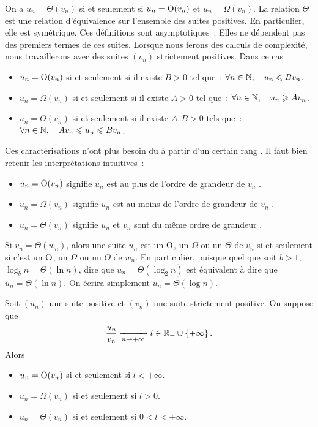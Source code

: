 \documentclass{magnolia}
\begin{document}
\begin{remarques}
\remarque On a $u_n=\Theta(v_n)$ si et seulement si  $u_n={\rm O}(v_n)$ et
  $u_n=\Omega(v_n)$.
\remarque La relation $\Theta$ est une relation d'équivalence sur l'ensemble des suites
  positives. En particulier, elle est symétrique.
\remarque Ces définitions sont asymptotiques~: Elles ne dépendent pas des premiers
  termes de ces suites.
\remarque Lorsque nous ferons des calculs de complexité, nous travaillerons avec des
  suites $(v_n)$ strictement positives. Dans ce cas
  \begin{itemize}
\item $u_n={\rm O}(v_n)$ si et seulement si il existe $B>0$ tel que~:
  $\forall n\in\mathbb{N},\quad u_n\leqslant B v_n$.
\item $u_n=\Omega(v_n)$ si et seulement si il existe $A>0$ tel que~:
  $\forall n\in\mathbb{N},\quad u_n \geqslant A v_n$.
\item $u_n=\Theta(v_n)$ si et seulement si il existe $A,B>0$ tels que~:
  $\forall n\in\mathbb{N},\quad A v_n \leqslant u_n\leqslant B v_n$.
  \end{itemize}
  Ces caractérisations n'ont plus besoin du \og à partir d'un certain rang \fg.
\remarque Il faut bien retenir les interprétations intuitives~:
  \begin{itemize}
    \item \og $u_n = {\rm O}(v_n)$ \fg signifie \og $u_n$ est au plus de l'ordre de grandeur
de $v_n$ \fg.
    \item \og $u_n = \Omega(v_n)$ \fg signifie \og $u_n$ est au moins de l'ordre de grandeur
de $v_n$ \fg.
    \item \og $u_n = \Theta(v_n)$ \fg signifie \og $u_n$ et $v_n$ sont du même ordre de
grandeur \fg.
  \end{itemize}
\remarque Si $v_n=\Theta(w_n)$, alors une suite $u_n$ est un ${\rm O}$, un $\Omega$
  ou un $\Theta$ de $v_n$ si et seulement si c'est un ${\rm O}$, un $\Omega$ ou un
  $\Theta$ de $w_n$. En particulier, puisque quel que soit
  $b>1$, $\log_b n = \Theta(\ln n)$, dire que $u_n=\Theta(\log_2 n)$ est équivalent à dire que $u_n=\Theta(\ln n)$.
  On écrira simplement $u_n=\Theta(\log n)$.
\end{remarques}

\begin{proposition}
Soit $(u_n)$ une suite positive et $(v_n)$ une suite strictement positive. On suppose
que
\[\frac{u_n}{v_n} \xrightarrow[n\rightarrow +\infty]{} l\in\mathbb{R}_+\cup\left\{+\infty\right\}.\]
Alors
\begin{itemize}
\item $u_n={\rm O}(v_n)$ si et seulement si $l<+\infty$.
\item $u_n=\Omega(v_n)$ si et seulement si $l> 0$.
\item $u_n=\Theta(v_n)$ si et seulement si $0<l<+\infty$.
\end{itemize}
\end{proposition}
\end{document}

